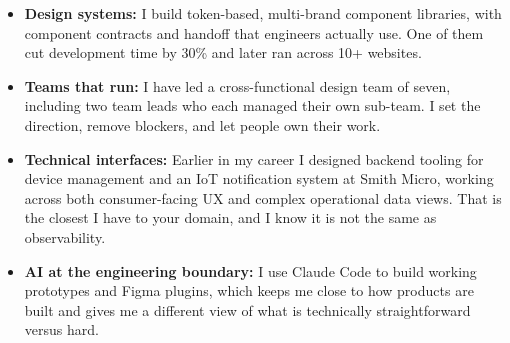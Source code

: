 \documentclass[]{cover}
\begin{document}


\currentdate{\today}



{\raggedright{}\fontsize{11pt}{13pt}\selectfont
\begin{itemize}
    \item \textbf{Design systems:} I build token-based, multi-brand component libraries, with component contracts and handoff that engineers actually use. One of them cut development time by 30\% and later ran across 10+ websites.
    \item \textbf{Teams that run:} I have led a cross-functional design team of seven, including two team leads who each managed their own sub-team. I set the direction, remove blockers, and let people own their work.
    \item \textbf{Technical interfaces:} Earlier in my career I designed backend tooling for device management and an IoT notification system at Smith Micro, working across both consumer-facing UX and complex operational data views. That is the closest I have to your domain, and I know it is not the same as observability.
    \item \textbf{AI at the engineering boundary:} I use Claude Code to build working prototypes and Figma plugins, which keeps me close to how products are built and gives me a different view of what is technically straightforward versus hard.
\end{itemize}\par}
\vspace{6pt}
\end{document}
